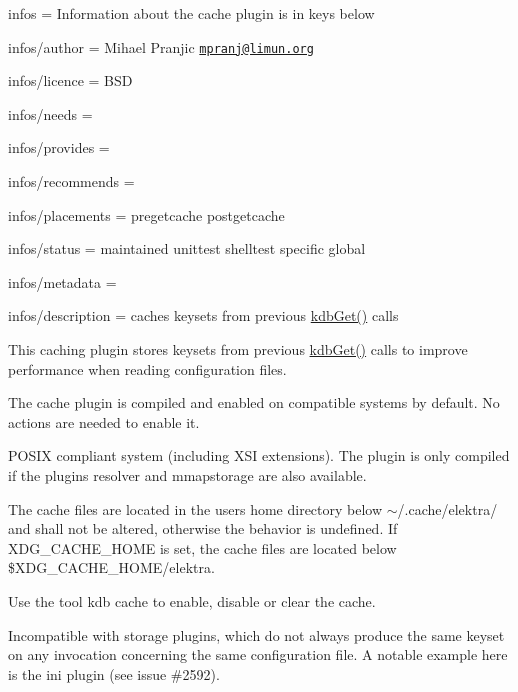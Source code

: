 
\begin{DoxyItemize}
\item infos = Information about the cache plugin is in keys below
\item infos/author = Mihael Pranjic \href{mailto:mpranj@limun.org}{\tt mpranj@limun.\+org}
\item infos/licence = B\+SD
\item infos/needs =
\item infos/provides =
\item infos/recommends =
\item infos/placements = pregetcache postgetcache
\item infos/status = maintained unittest shelltest specific global
\item infos/metadata =
\item infos/description = caches keysets from previous {\ttfamily \hyperlink{group__kdb_ga28e385fd9cb7ccfe0b2f1ed2f62453a1}{kdb\+Get()}} calls
\end{DoxyItemize}

This caching plugin stores keysets from previous {\ttfamily \hyperlink{group__kdb_ga28e385fd9cb7ccfe0b2f1ed2f62453a1}{kdb\+Get()}} calls to improve performance when reading configuration files.

The cache plugin is compiled and enabled on compatible systems by default. No actions are needed to enable it.

P\+O\+S\+IX compliant system (including X\+SI extensions). The plugin is only compiled if the plugins {\ttfamily resolver} and {\ttfamily mmapstorage} are also available.

The cache files are located in the user\textquotesingle{}s home directory below {\ttfamily $\sim$/.cache/elektra/} and shall not be altered, otherwise the behavior is undefined. If {\ttfamily X\+D\+G\+\_\+\+C\+A\+C\+H\+E\+\_\+\+H\+O\+ME} is set, the cache files are located below {\ttfamily \$\+X\+D\+G\+\_\+\+C\+A\+C\+H\+E\+\_\+\+H\+O\+ME/elektra}.

Use the tool {\ttfamily kdb cache} to enable, disable or clear the cache.

Incompatible with storage plugins, which do not always produce the same keyset on any invocation concerning the same configuration file. A notable example here is the {\ttfamily ini} plugin (see issue \#2592). 